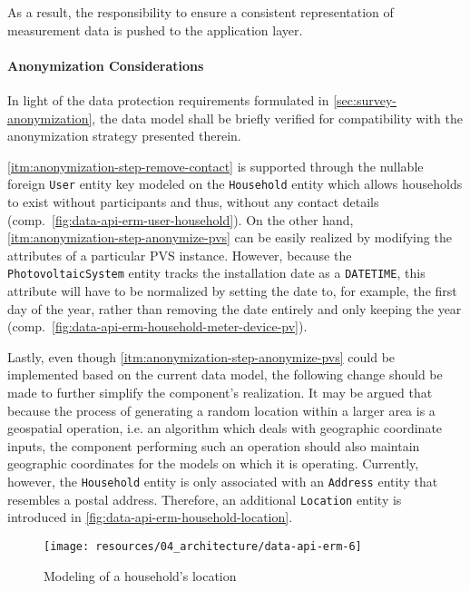 As a result, the responsibility to ensure a consistent representation of measurement data is pushed to the application layer.


\paragraph{Anonymization Considerations}
In light of the data protection requirements formulated in \autoref{sec:survey-anonymization}, the data model shall be briefly verified for compatibility with the anonymization strategy presented therein.

\ref{itm:anonymization-step-remove-contact} is supported through the nullable foreign \texttt{User} entity key modeled on the \texttt{Household} entity which allows households to exist without participants and thus, without any contact details (comp.~\autoref{fig:data-api-erm-user-household}). On the other hand, \ref{itm:anonymization-step-anonymize-pvs} can be easily realized by modifying the attributes of a particular \acs{PVS} instance. However, because the \texttt{PhotovoltaicSystem} entity tracks the installation date as a \texttt{DATETIME}, this attribute will have to be normalized by setting the date to, for example, the first day of the year, rather than removing the date entirely and only keeping the year (comp.~\autoref{fig:data-api-erm-household-meter-device-pv}).

Lastly, even though \ref{itm:anonymization-step-anonymize-pvs} could be implemented based on the current data model, the following change should be made to further simplify the component's realization. It may be argued that because the process of generating a random location within a larger area is a geospatial operation, i.e. an algorithm which deals with geographic coordinate inputs, the component performing such an operation should also maintain geographic coordinates for the models on which it is operating. Currently, however, the \texttt{Household} entity is only associated with an \texttt{Address} entity that resembles a postal address. Therefore, an additional \texttt{Location} entity is introduced in \autoref{fig:data-api-erm-household-location}.

\begin{figure}[hbt]
  \centering
  \texttt{[image: resources/04\_architecture/data-api-erm-6]}
  \caption{Modeling of a household's location}
  \label{fig:data-api-erm-household-location}
\end{figure}

